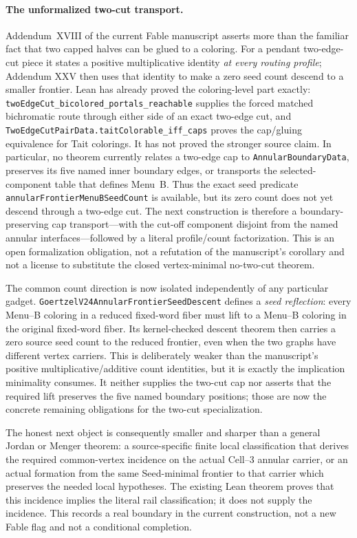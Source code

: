 \documentclass[11pt]{article}
\theoremstyle{definition}
\begin{document}
\paragraph{The unformalized two-cut transport.}  Addendum~XVIII of the
current Fable manuscript asserts more than the familiar fact that two capped
halves can be glued to a coloring.  For a pendant two-edge-cut piece it states
a positive multiplicative identity \emph{at every routing profile}; Addendum
XXV then uses that identity to make a zero seed count descend to a smaller
frontier.  Lean has already proved the coloring-level part exactly:
\texttt{twoEdgeCut\_bicolored\_portals\_reachable} supplies the forced
matched bichromatic route through either side of an exact two-edge cut, and
\texttt{TwoEdgeCutPairData.taitColorable\_iff\_caps} proves the cap/gluing
equivalence for Tait colorings.  It has not proved the stronger source claim.
In particular, no theorem currently relates a two-edge cap to
\texttt{AnnularBoundaryData}, preserves its five named inner boundary edges,
or transports the selected-component table that defines Menu~B.  Thus the
exact seed predicate
\texttt{annularFrontierMenuBSeedCount} is available, but its zero count does
not yet descend through a two-edge cut.  The next construction is therefore a
boundary-preserving cap transport---with the cut-off component disjoint from
the named annular interfaces---followed by a literal profile/count
factorization.  This is an open formalization obligation, not a refutation of
the manuscript's corollary and not a license to substitute the closed
vertex-minimal no-two-cut theorem.

The common count direction is now isolated independently of any particular
gadget.  \texttt{GoertzelV24AnnularFrontierSeedDescent} defines a
\emph{seed reflection}: every Menu--B coloring in a reduced fixed-word fiber
must lift to a Menu--B coloring in the original fixed-word fiber.  Its
kernel-checked descent theorem then carries a zero source seed count to the
reduced frontier, even when the two graphs have different vertex carriers.
This is deliberately weaker than the manuscript's positive
multiplicative/additive count identities, but it is exactly the implication
minimality consumes.  It neither supplies the two-cut cap nor asserts that
the required lift preserves the five named boundary positions; those are now
the concrete remaining obligations for the two-cut specialization.

The honest next object is consequently smaller and sharper than a general
Jordan or Menger theorem: a source-specific finite local classification that
derives the required common-vertex incidence on the actual Cell--3 annular
carrier, or an actual formation from the same Seed-minimal frontier to that
carrier which preserves the needed local hypotheses.  The existing Lean
theorem proves that this incidence implies the literal rail classification;
it does not supply the incidence.  This records a real boundary in the
current construction, not a new Fable flag and not a conditional completion.
\end{document}
